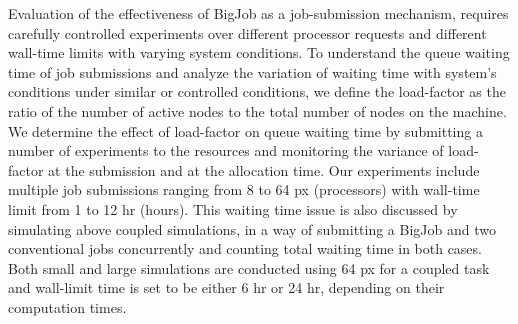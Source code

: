 \documentclass[conference,final]{IEEEtran}
\newcommand{\jhanote}[1]{ {\textcolor{red} { ***Jha: #1 }}}
\newcommand{\skonote}[1]{ {\textcolor{blue} { ***Jeff: #1 }}}
\newcommand{\jhanote}[1]{}
\newcommand{\skonote}[1]{}
\begin{document}



Evaluation of the effectiveness of BigJob as a job-submission
mechanism, requires carefully controlled experiments over different
processor requests and different wall-time limits with varying system
conditions.  To understand the queue waiting time of job submissions
and analyze the variation of waiting time with system's conditions
under similar or controlled conditions, we define the load-factor as
the ratio of the number of active nodes to the total number of nodes
on the machine. We determine the effect of load-factor on queue
waiting time by submitting a number of experiments to the resources
and monitoring the variance of load-factor at the submission and at
the allocation time. Our experiments include multiple job submissions
ranging from 8 to 64 px (processors) with wall-time limit from 1 to 12
hr (hours). This waiting time issue is also discussed by simulating above
coupled simulations, in a way of submitting a BigJob and two
conventional jobs concurrently and counting total waiting time in both
cases. Both small and large simulations are conducted using 64
px for a coupled task and wall-limit time is set to be either
6 hr or 24 hr, depending on their computation times.
\end{document}
